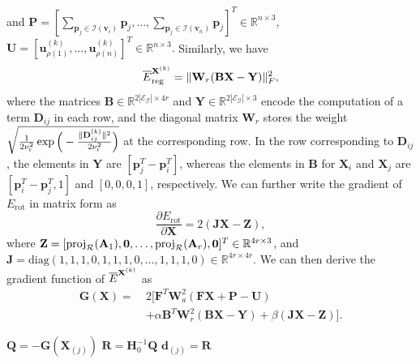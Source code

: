 and
$
    \mathbf{P}= \left[\sum_{\mathbf{p}_j \in \mathcal{I}(\mathbf{v}_i)} \mathbf{p}_j, \ldots, \sum_{\mathbf{p}_j \in \mathcal{I}(\mathbf{v}_n)} \mathbf{p}_j\right]^T \in \mathbb{R}^{n \times 3}
$,
$\mathbf{U}  = \left[ \mathbf{u}_{\rho(1)}^{(k)},..., \mathbf{u}_{\rho(n)}^{(k)}\right]^T \in \mathbb{R}^{n \times 3}.
$
Similarly, we have
\begin{equation}
\overline{E}_{\text{reg}}^{\mathbf{X}^{(k)}} = \|\mathbf{W}_r(\mathbf{B} \mathbf{X} -\mathbf{Y})\|_F^2,
\label{eq:regMatrixForm}
\end{equation}
where the matrices $\mathbf{B} \in \mathbb{R}^{2 |\mathcal{E}_{\mathcal{G}}| \times 4 r}$ and $\mathbf{Y} \in \mathbb{R}^{2 |\mathcal{E}_{\mathcal{G}}| \times 3}$ encode the computation of a term $\mathbf{D}_{ij}$ in each row, and the diagonal matrix $\mathbf{W}_r$ stores the weight $\sqrt{\frac{1}{2 \nu_{\textrm{r}}^2}\exp\Big(-\frac{\|\mathbf{D}_{ij}^{(k)}\|^2}{2 \nu_{\textrm{r}}^2}\Big)}$ at the corresponding row.
In the row corresponding to $\mathbf{D}_{ij}$, the elements in $\mathbf{Y}$ are $[\mathbf{p}_j^T - \mathbf{p}_i^T]$, whereas the elements in $\mathbf{B}$ for $\mathbf{X}_i$ and $\mathbf{X}_j$ are $[\mathbf{p}_i^T - \mathbf{p}_j^T, 1]$ and $[0, 0, 0, 1]$, respectively.
We can further write the gradient of $E_{\text{rot}}$ in matrix form as
\[
    \frac{\partial E_{\text{rot}}}{\partial \mathbf{X}}
    = 2 (\mathbf{J} \mathbf{X} - \mathbf{Z}),
\]
where $\mathbf{Z} = [ \operatorname*{proj}_{\mathcal{R}}(\mathbf{A}_1), \mathbf{0}, \ldots, \operatorname*{proj}_{\mathcal{R}}(\mathbf{A}_r), \mathbf{0} ]^T \in \mathbb{R}^{4r \times 3}$, and $\mathbf{J} = \textrm{diag} (1, 1, 1, 0, 1, 1, 1, 0, \ldots, 1, 1, 1, 0) \in \mathbb{R}^{4r \times 4r}$.
We can then derive the gradient function of $\overline{E}^{\mathbf{X}^{(k)}}$ as
\begin{equation}
\begin{aligned}
    \mathbf{G}(\mathbf{X})
     =~&2 [\mathbf{F}^T \mathbf{W}_a^2 (\mathbf{F}\mathbf{X}+\mathbf{P}-\mathbf{U}) \\
     &+
     \alpha \mathbf{B}^T \mathbf{W}_r^2(\mathbf{B} \mathbf{X} -\mathbf{Y})
        +
     \beta (\mathbf{J} \mathbf{X} - \mathbf{Z})].
\end{aligned}
\label{eq:Gradient}
\end{equation}


\begin{algorithm}[t!]
	\label{Alg:TwoLoopRecursion}
	\caption{Two-loop recursion for computing descent direction $\mathbf{d}_{(j)}$}
	$\mathbf{Q} = - \mathbf{G}(\mathbf{X}_{(j)})$\;
	$\mathbf{R} = \mathbf{H}_0^{-1} \mathbf{Q}$\;
	$\mathbf{d}_{(j)} = \mathbf{R}$\;
\end{algorithm}


